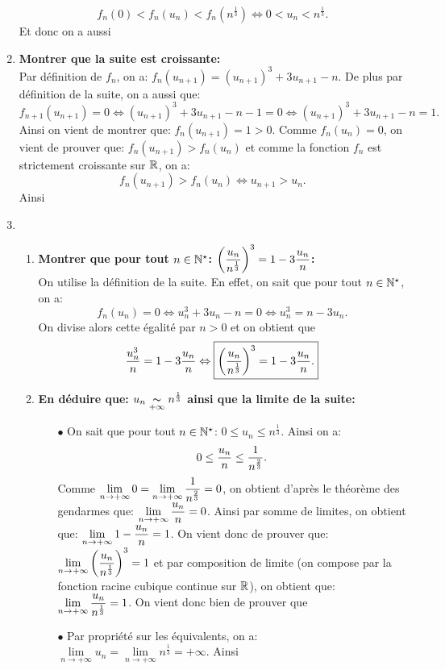 \documentclass[a4paper, 11pt,reqno]{article}
\begin{document}
\begin{correction}
\begin{enumerate}
		      $$f_n(0)<f_n(u_n)<f_n(n^{\frac{1}{3}}) \Leftrightarrow 0<u_n<n^{\frac{1}{3}}.$$
		      Et donc on a aussi 
		\item  \textbf{Montrer que la suite est croissante:}\\
		      \noindent Par d\'efinition de $f_n$, on a: $f_n(u_{n+1})=(u_{n+1})^3+3u_{n+1}-n$. De plus par d\'efinition de la suite, on a aussi que:
		      $$f_{n+1}(u_{n+1})=0\Leftrightarrow (u_{n+1})^3+3u_{n+1}-n-1=0\Leftrightarrow (u_{n+1})^3+3u_{n+1}-n=1.$$
		      Ainsi on vient de montrer que: $f_n(u_{n+1})=1>0$. Comme $f_n(u_n)=0$, on vient de prouver que: $f_n(u_{n+1})>f_n(u_n)$ et comme la fonction $f_n$ est strictement croissante sur $\mathbb{R}$, on a:
		      $$f_n(u_{n+1})>f_n(u_n) \Leftrightarrow u_{n+1}>u_n.$$
		      Ainsi 
		\item
		      \begin{enumerate}
			      \item \textbf{Montrer que pour tout $n\in\mathbb{N}^{\star}$: $\left( \displaystyle\frac{u_n}{n^{\frac{1}{3}}} \right)^3=1-3\displaystyle\frac{u_n}{n}$:}\\
			            \noindent On utilise la d\'efinition de la suite. En effet, on sait que pour tout $n\in\mathbb{N}^{\star}$, on a:
			            $$f_n(u_n)=0\Leftrightarrow u_n^3+3u_n-n=0\Leftrightarrow u_n^3=n-3u_n.$$
			            On divise alors cette \'egalit\'e par $n>0$ et on obtient que
			            $$\displaystyle\frac{u_n^3}{n}=1-3\displaystyle\frac{u_n}{n}\Leftrightarrow \fbox{$\left(  \displaystyle\frac{u_n}{n^{\frac{1}{3}}}\right)^3=1-3\displaystyle\frac{u_n}{n}.$}$$
			      \item \textbf{En d\'eduire que: $u_n\underset{+\infty}{\thicksim} n^{\frac{1}{3}}$ ainsi que la limite de la suite:}
			            \begin{itemize}
				            \item[$\bullet$] On sait que pour tout $n\in\mathbb{N}^{\star}$: $0\leq u_n\leq n^{\frac{1}{3}}$. Ainsi on a:
				                  $$0\leq \displaystyle\frac{u_n}{n} \leq \displaystyle\frac{1}{n^{\frac{2}{3}}}.$$
				                  Comme $\lim\limits_{n\to +\infty} 0=\lim\limits_{n\to +\infty}  \displaystyle\frac{1}{n^{\frac{2}{3}}}=0$, on obtient d'apr\`{e}s le th\'eor\`{e}me des gendarmes que: $\lim\limits_{n\to +\infty} \displaystyle\frac{u_n}{n}=0$. Ainsi par somme de limites, on obtient que: $\lim\limits_{n\to +\infty} 1-\displaystyle\frac{u_n}{n}=1$. On vient donc de prouver que: $\lim\limits_{n\to +\infty} \left(  \displaystyle\frac{u_n}{n^{\frac{1}{3}}}\right)^3=1$ et par composition de limite (on compose par la fonction racine cubique continue sur $\mathbb{R}$), on obtient que: $\lim\limits_{n\to +\infty}  \displaystyle\frac{u_n}{n^{\frac{1}{3}}}=1$. On vient donc bien de prouver que 
				            \item[$\bullet$] Par propri\'et\'e sur les \'equivalents, on a: $\lim\limits_{n\to +\infty} u_n=\lim\limits_{n\to +\infty} n^{\frac{1}{3}}=+\infty$. Ainsi 
			            \end{itemize}
		      \end{enumerate}
	\end{enumerate}
\end{correction}
\end{document}
